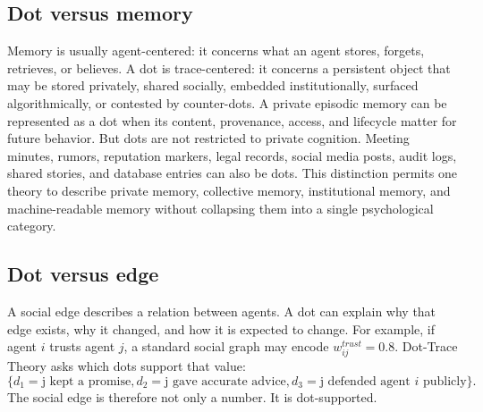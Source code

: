 \documentclass[11pt]{article}
\theoremstyle{remark}
\begin{document}
\subsection{Dot versus memory}\label{dot-versus-memory}

Memory is usually agent-centered: it concerns what an agent stores, forgets, retrieves, or believes. A dot is trace-centered: it concerns a persistent object that may be stored privately, shared socially, embedded institutionally, surfaced algorithmically, or contested by counter-dots. A private episodic memory can be represented as a dot when its content, provenance, access, and lifecycle matter for future behavior. But dots are not restricted to private cognition. Meeting minutes, rumors, reputation markers, legal records, social media posts, audit logs, shared stories, and database entries can also be dots. This distinction permits one theory to describe private memory, collective memory, institutional memory, and machine-readable memory without collapsing them into a single psychological category.

\subsection{Dot versus edge}\label{dot-versus-edge}

A social edge describes a relation between agents. A dot can explain why
that edge exists, why it changed, and how it is expected to change. For
example, if agent \(i\) trusts agent \(j\), a standard social graph may
encode \(w_{ij}^{trust}=0.8\). Dot-Trace Theory asks which dots support
that value: \[
\{d_1 = \text{j kept a promise}, d_2 = \text{j gave accurate advice}, d_3 = \text{j defended agent } i \text{ publicly}\}.
\] The social edge is therefore not only a number. It is dot-supported.
\end{document}

